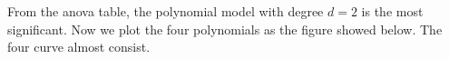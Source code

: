 \documentclass[10pt]{article}
\begin{document}
From the anova table, the polynomial model with degree $d = 2$ is the most significant. Now we plot the four polynomials as the figure showed below. The four curve almost consist.
\end{document}
